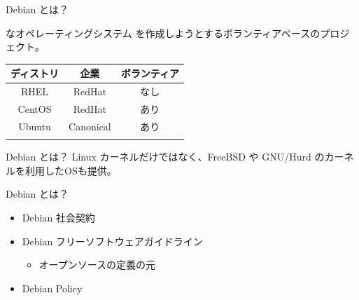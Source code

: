 \begin{frame}{Debian とは？}

{\color{red}{フリー/オープン}}な{\color{red}{ユニバーサル}}オペレーティングシステム を作成しようとするボランティアベースのプロジェクト。

\begin{table}[htb]
  \begin{tabular}{|c|c|c|}
    \hline
    ディストリ & 企業 & ボランティア \\ \hline
    RHEL & RedHat & なし  \\ \hline
    CentOS & RedHat & あり \\ \hline
    Ubuntu  & Canonical & あり \\ \hline
    \color{red}{Debian}  & \color{red}{なし} & \color{red}{あり} \\ \hline
  \end{tabular}
\end{table}

\end{frame}


\begin{frame}{Debian とは？}
Linux カーネルだけではなく、FreeBSD や GNU/Hurd のカーネルを利用したOSも提供。

\begin{center}
\end{center}

\end{frame}


\begin{frame}{Debian とは？}

  \begin{itemize}
  \item Debian 社会契約
  \item Debian フリーソフトウェアガイドライン
    \begin{itemize}
      \item オープンソースの定義の元
    \end{itemize}
  \item Debian Policy
  \end{itemize}

\end{frame}

